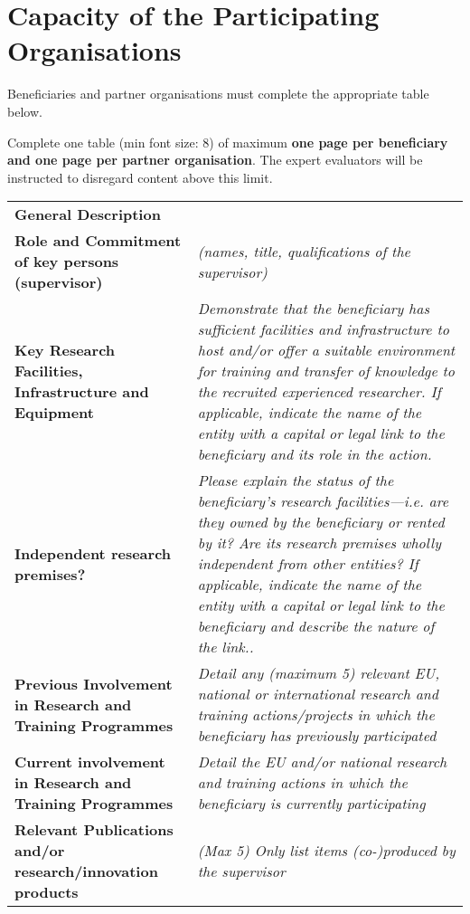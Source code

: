 \newpage

\section{Capacity of the Participating Organisations}
\label{sec:capacities}

Beneficiaries and partner organisations must complete the
appropriate table below.

\medskip\noindent
Complete one table (min font size: 8) of maximum \textbf{one page per
beneficiary and one page per partner organisation}.  The expert
evaluators will be instructed to disregard content above this
limit.

\vspace{\baselineskip}

\begin{table}[h!]
{\fontsize{9bp}{1em}\selectfont %
\noindent\begin{tabular}{|>{\raggedright}p{}|p{}|}\hline
  \multicolumn{2}{|l|}{\cellcolor{gray!50}\textbf{Beneficiary X}} \\\hline
\textbf{General Description} &

\\\hline
\textbf{Role and Commitment of key persons (supervisor)} &
{\em (names, title, qualifications of the supervisor)}
{\em }
\\\hline
\textbf{Key Research Facilities, Infrastructure and Equipment} &
{\em Demonstrate that the beneficiary has sufficient facilities
and infrastructure to host and/or offer a suitable environment for
training and transfer of knowledge to the recruited experienced
researcher. If applicable, indicate the name of the entity with a
capital or legal link to the beneficiary and its role in the
action.}
\\\hline
\textbf{Independent research premises?} &
{\em Please explain the status of the beneficiary's research
facilities\----i.e. are they owned by the beneficiary or rented by
it? Are its research premises wholly independent from other
entities? If applicable, indicate the name of the entity with a
capital or legal link to the beneficiary and describe the nature
of the link..} 
\\\hline
\textbf{Previous Involvement in Research and Training Programmes} &
{\em Detail any (maximum 5) relevant EU, national or international research and training actions/projects in which the beneficiary has previously participated}
\\\hline
\textbf{Current involvement in Research and Training Programmes} &
{\em Detail the EU and/or national research and training actions in which the beneficiary is currently participating}
\\\hline
\textbf{Relevant Publications and/or research/innovation products} &
{\em (Max 5) Only list items (co-)produced by the supervisor}
\\\hline
\end{tabular}}
\end{table}

